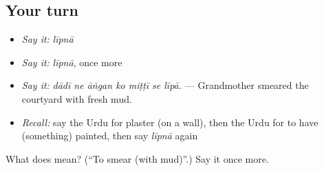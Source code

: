 \subsection*{Your turn}
\begin{itemize}
\raggedright
  \item \emph{Say it:} \emph{līpnā}
  \item \emph{Say it:} \emph{līpnā}, once more
  \item \emph{Say it:} \emph{dādī ne āṅgan ko miṭṭī se līpā.} — Grandmother smeared the courtyard with fresh mud.
  \item \emph{Recall:} say the Urdu for plaster (on a wall), then the Urdu for to have (something) painted, then say \emph{līpnā} again
\end{itemize}

\begin{tcolorbox}[breakable,colback=teal!4,colframe=teal!35!black,title={Before you move on}]
What does  mean? (\textquotedblleft{}To smear (with mud)\textquotedblright{}.) Say it once more.
\end{tcolorbox}
